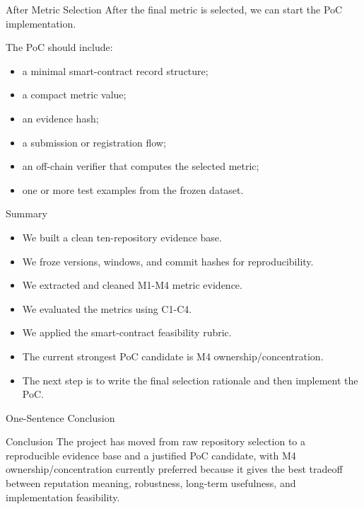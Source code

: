 \documentclass[aspectratio=169,11pt]{beamer}
\begin{document}
\begin{frame}{After Metric Selection}
  After the final metric is selected, we can start the PoC implementation.

  \vspace{0.2cm}
  The PoC should include:
  \begin{itemize}
    \item a minimal smart-contract record structure;
    \item a compact metric value;
    \item an evidence hash;
    \item a submission or registration flow;
    \item an off-chain verifier that computes the selected metric;
    \item one or more test examples from the frozen dataset.
  \end{itemize}
\end{frame}

\begin{frame}{Summary}
  \begin{itemize}
    \item We built a clean ten-repository evidence base.
    \item We froze versions, windows, and commit hashes for reproducibility.
    \item We extracted and cleaned M1-M4 metric evidence.
    \item We evaluated the metrics using C1-C4.
    \item We applied the smart-contract feasibility rubric.
    \item The current strongest PoC candidate is M4 ownership/concentration.
    \item The next step is to write the final selection rationale and then implement the PoC.
  \end{itemize}
\end{frame}

\begin{frame}{One-Sentence Conclusion}
  \begin{block}{Conclusion}
    The project has moved from raw repository selection to a reproducible evidence base and a justified PoC candidate, with M4 ownership/concentration currently preferred because it gives the best tradeoff between reputation meaning, robustness, long-term usefulness, and implementation feasibility.
  \end{block}
\end{frame}
\end{document}
